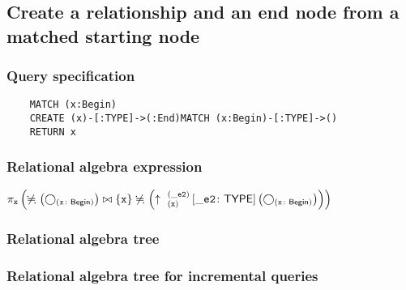 	\subsection{Create a relationship and an end node from a matched starting node}

	\subsubsection*{Query specification}

	\begin{lstlisting}
	MATCH (x:Begin)
	CREATE (x)-[:TYPE]->(:End)MATCH (x:Begin)-[:TYPE]->()
	RETURN x
	\end{lstlisting}


	\subsubsection*{Relational algebra expression}

	$\projection{\var{x}} \left(\alldifferent{} \left(\getvertices{x}{Begin}\right) \join \{\var{x}\} \alldifferent{} \left(\expandout{x}{\_e2}{}{\_e2}{TYPE} \left(\getvertices{x}{Begin}\right)\right)\right)$

	\subsubsection*{Relational algebra tree}


	\subsubsection*{Relational algebra tree for incremental queries}

